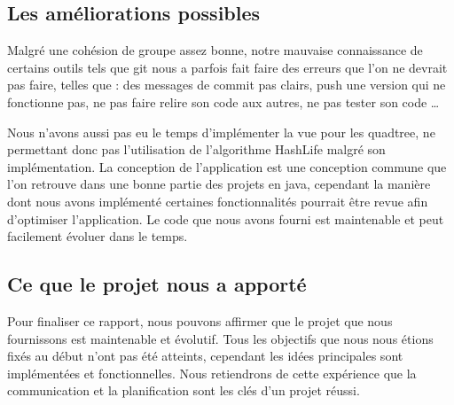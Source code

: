 \documentclass[12pt]{article}
\begin{document}
			\subsection{Les améliorations possibles}
			Malgré une cohésion de groupe assez bonne, notre mauvaise connaissance de certains outils tels que git nous a parfois fait faire des erreurs que l’on ne devrait pas faire, telles que : des messages de commit pas clairs, push une version qui ne fonctionne pas, ne pas faire relire son code aux autres, ne pas tester son code …
			
			Nous n’avons aussi pas eu le temps d’implémenter la vue pour les quadtree, ne permettant donc pas l’utilisation de l’algorithme HashLife malgré son implémentation. La conception de l’application est une conception commune que l’on retrouve dans une bonne partie des projets en java, cependant la manière dont nous avons implémenté certaines fonctionnalités pourrait être revue afin d’optimiser l’application. Le code que nous avons fourni est maintenable et peut facilement évoluer dans le temps.
			
			\subsection{Ce que le projet nous a apporté}
			Pour finaliser ce rapport, nous pouvons affirmer que le projet que nous fournissons est maintenable et évolutif. Tous les objectifs que nous nous étions fixés au début n’ont pas été atteints, cependant les idées principales sont implémentées et fonctionnelles. Nous retiendrons de cette expérience que la communication et la planification sont les clés d’un projet réussi.
			
\end{document}
